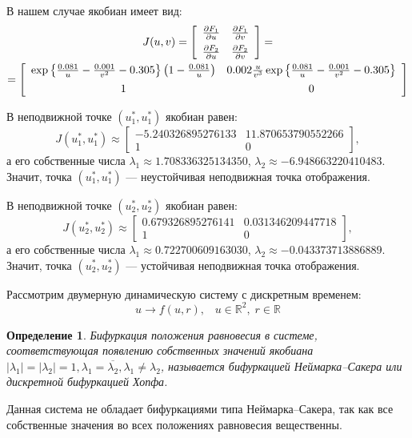 \documentclass[11pt]{article}
\newtheorem{definition}{Определение}
\newcommand\abs[1]{\left\lvert#1\right\rvert}
\begin{document}
В нашем случае якобиан имеет вид:
\begin{gather}
J(u, v) = \left[ \begin{array}{ccc}
\frac{\partial F_1}{\partial u} & \frac{\partial F_1}{\partial v} \\[0.5em]
\frac{\partial F_2}{\partial u} & \frac{\partial F_2}{\partial v}
\end{array} \right] = \notag \\
= \left[ \begin{array}{ccc}
\exp{ \left\{ \frac{0.081}{u} - \frac{0.001}{v^2} - 0.305 \right\} }\left( 1 - \frac{0.081}{u} \right) &  0.002 \frac{u}{v^3} \exp{ \left\{ \frac{0.081}{u} - \frac{0.001}{v^2} - 0.305 \right\} } \\[0.5em]
1 & 0
\end{array} \right] \notag
\end{gather}

В неподвижной точке $(u_1^*, u_1^*)$ якобиан равен:
$$
J(u_1^*, u_1^*) \approx \left[ \begin{array}{ccc}
-5.240326895276133 & 11.870653790552266 \\[0.5em]
1 & 0
\end{array} \right],
$$
а его собственные числа $\lambda_1 \approx 1.708336325134350$, $\lambda_2 \approx -6.948663220410483$. Значит, точка $(u_1^*, u_1^*)$ --- неустойчивая неподвижная точка отображения.

В неподвижной точке $(u_2^*, u_2^*)$ якобиан равен:
$$
J(u_2^*, u_2^*) \approx \left[ \begin{array}{ccc}
0.679326895276141 & 0.031346209447718 \\[0.5em]
1 & 0
\end{array} \right],
$$
а его собственные числа $\lambda_1 \approx 0.722700609163030$, $\lambda_2 \approx -0.043373713886889$. Значит, точка $(u_2^*, u_2^*)$ --- устойчивая неподвижная точка отображения.

Рассмотрим двумерную динамическую систему с дискретным временем:
$$
u \rightarrow f(u, r), \; \; \; u \in \mathbb{R}^2, \; r \in \mathbb{R}
$$
\begin{definition}
Бифуркация положения равновесия в системе, соответствующая появлению собственных значений якобиана $\abs{\lambda_1} = \abs{\lambda_2} = 1, \lambda_1 = \overline{\lambda_2}, \lambda_1 \neq \lambda_2$, называется бифуркацией Неймарка--Сакера или дискретной бифуркацией Хопфа.
\end{definition}

Данная система не обладает бифуркациями типа Неймарка--Сакера, так как все собственные значения во всех положениях равновесия вещественны.
\end{document}
